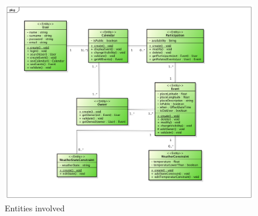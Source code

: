 \begin{itemize}
\begin{center}
\begin{figure}[H]
    \includegraphics[width=1\textwidth]{../BCEDiagram/BCE/EntityOverview/Entity.png}
    \caption{Entities involved}
     \label{fig:entityovervie}
     \end{figure}
   \end{center}  



\end{itemize}
